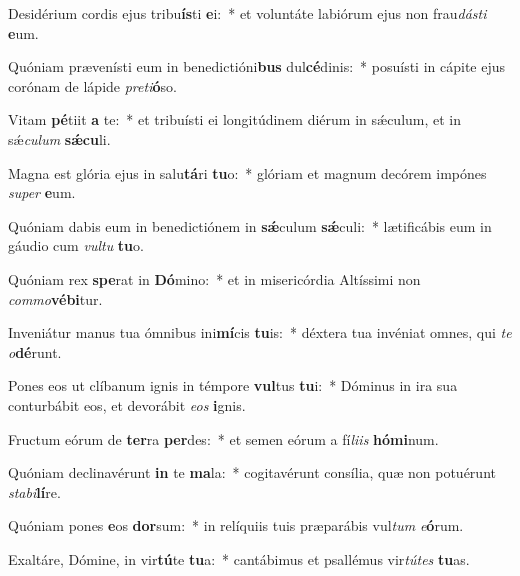 \item Desidérium cordis ejus tribu\textbf{ís}ti \textbf{e}i:~* et voluntáte labiórum ejus non frau\textit{dás}\textit{ti} \textbf{e}um.
\item Quóniam prævenísti eum in benedictióni\textbf{bus} dul\textbf{cé}dinis:~* posuísti in cápite ejus corónam de lápide \textit{pre}\textit{ti}\textbf{ó}so.
\item Vitam \textbf{pé}tiit \textbf{a} te:~* et tribuísti ei longitúdinem diérum in sǽculum, et in sǽ\textit{cu}\textit{lum} \textbf{sǽ}\textbf{cu}li.
\item Magna est glória ejus in salu\textbf{tá}ri \textbf{tu}o:~* glóriam et magnum decórem impónes \textit{su}\textit{per} \textbf{e}um.
\item Quóniam dabis eum in benedictiónem in \textbf{sǽ}culum \textbf{sǽ}culi:~* lætificábis eum in gáudio cum \textit{vul}\textit{tu} \textbf{tu}o.
\item Quóniam rex \textbf{spe}rat in \textbf{Dó}mino:~* et in misericórdia Altíssimi non \textit{com}\textit{mo}\textbf{vé}\textbf{bi}tur.
\item Inveniátur manus tua ómnibus ini\textbf{mí}cis \textbf{tu}is:~* déxtera tua invéniat omnes, qui \textit{te} \textit{o}\textbf{dé}runt.
\item Pones eos ut clíbanum ignis in témpore \textbf{vul}tus \textbf{tu}i:~* Dóminus in ira sua conturbábit eos, et devorábit \textit{e}\textit{os} \textbf{i}gnis.
\item Fructum eórum de \textbf{ter}ra \textbf{per}des:~* et semen eórum a fí\textit{li}\textit{is} \textbf{hó}\textbf{mi}num.
\item Quóniam declinavérunt \textbf{in} te \textbf{ma}la:~* cogitavérunt consília, quæ non potuérunt \textit{sta}\textit{bi}\textbf{lí}re.
\item Quóniam pones \textbf{e}os \textbf{dor}sum:~* in relíquiis tuis præparábis vul\textit{tum} \textit{e}\textbf{ó}rum.
\item Exaltáre, Dómine, in vir\textbf{tú}te \textbf{tu}a:~* cantábimus et psallémus vir\textit{tú}\textit{tes} \textbf{tu}as.
